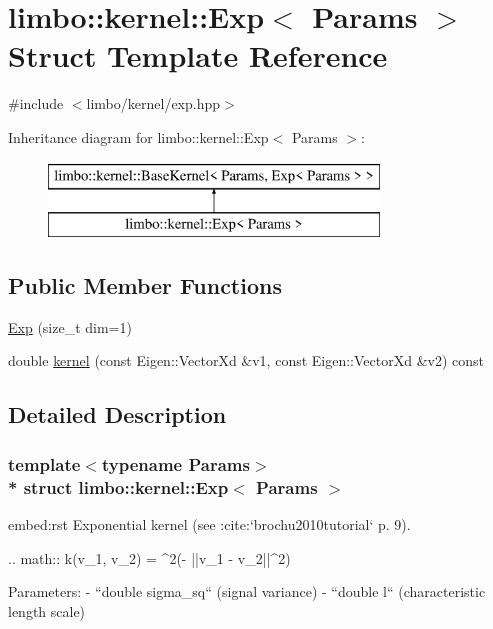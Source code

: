 \hypertarget{structlimbo_1_1kernel_1_1_exp}{}\section{limbo\+:\+:kernel\+:\+:Exp$<$ Params $>$ Struct Template Reference}
\label{structlimbo_1_1kernel_1_1_exp}


{\ttfamily \#include $<$limbo/kernel/exp.\+hpp$>$}

Inheritance diagram for limbo\+:\+:kernel\+:\+:Exp$<$ Params $>$\+:\begin{figure}[H]
\begin{center}
\leavevmode
\includegraphics[height=2.000000cm]{structlimbo_1_1kernel_1_1_exp}
\end{center}
\end{figure}
\subsection*{Public Member Functions}
\begin{DoxyCompactItemize}
\item 
\hyperlink{structlimbo_1_1kernel_1_1_exp_abec48720f518fa51be7f74bf102add09}{Exp} (size\+\_\+t dim=1)
\item 
double \hyperlink{structlimbo_1_1kernel_1_1_exp_abb1accd4f07243ef60fbd9441ebeb323}{kernel} (const Eigen\+::\+Vector\+Xd \&v1, const Eigen\+::\+Vector\+Xd \&v2) const 
\end{DoxyCompactItemize}


\subsection{Detailed Description}
\subsubsection*{template$<$typename Params$>$\\*
struct limbo\+::kernel\+::\+Exp$<$ Params $>$}

\begin{DoxyVerb}embed:rst
Exponential kernel (see :cite:`brochu2010tutorial` p. 9).

.. math::
    k(v_1, v_2)  = \sigma^2\exp \Big(- ||v_1 - v_2||^2\Big)

Parameters:
  - ``double sigma_sq`` (signal variance)
  - ``double l`` (characteristic length scale)
\end{DoxyVerb}
 

